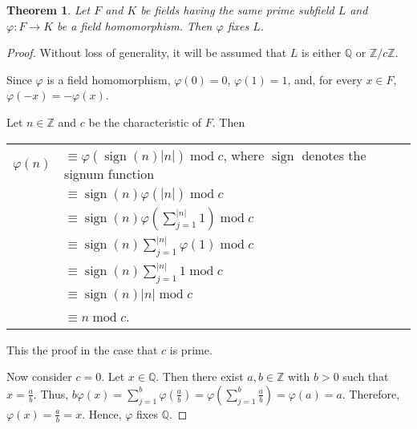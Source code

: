 \documentclass[12pt]{article}
\newtheorem*{thm*}{Theorem}
\begin{document}
\begin{thm*}
Let $F$ and $K$ be fields having the same prime subfield $L$ and $\varphi \colon F \to K$ be a field homomorphism.  Then $\varphi$ fixes $L$.
\end{thm*}

\begin{proof}
Without loss of generality, it will be assumed that $L$ is either $\mathbb{Q}$ or $\mathbb{Z}/c\mathbb{Z}$.

Since $\varphi$ is a field homomorphism, $\varphi(0)=0$, $\varphi(1)=1$, and, for every $x \in F$, $\varphi(-x)=-\varphi(x)$.

Let $n \in \mathbb{Z}$ and $c$ be the characteristic of $F$.  Then

\begin{center}
\begin{tabular}{rl}
$\varphi(n)$ & $\equiv \varphi(\operatorname{sign}(n)|n|) \operatorname{mod} c$, where $\operatorname{sign}$ denotes the signum function \\
& $\displaystyle \equiv \operatorname{sign}(n)\varphi(|n|) \operatorname{mod} c$ \\
& $\displaystyle \equiv \operatorname{sign}(n)\varphi\left(\sum_{j=1}^{|n|} 1\right) \operatorname{mod} c$ \\
& $\displaystyle \equiv \operatorname{sign}(n)\sum_{j=1}^{|n|} \varphi(1) \operatorname{mod} c$ \\
& $\displaystyle \equiv \operatorname{sign}(n)\sum_{j=1}^{|n|} 1 \operatorname{mod} c$ \\
& $\equiv \operatorname{sign}(n)|n| \operatorname{mod} c$ \\
& $\equiv n \operatorname{mod} c$. \end{tabular}
\end{center}

This  the proof in the case that $c$ is prime.

Now consider $c=0$.  Let $x \in \mathbb{Q}$.  Then there exist $a,b \in \mathbb{Z}$ with $b>0$ such that $\displaystyle x=\frac{a}{b}$.  Thus, $\displaystyle b\varphi(x)=\sum_{j=1}^b\varphi\left(\frac{a}{b}\right)=\varphi\left(\sum_{j=1}^b \frac{a}{b}\right)=\varphi(a)=a$.  Therefore, $\displaystyle \varphi(x)=\frac{a}{b}=x$.  Hence, $\varphi$ fixes $\mathbb{Q}$.
\end{proof}
\end{document}
